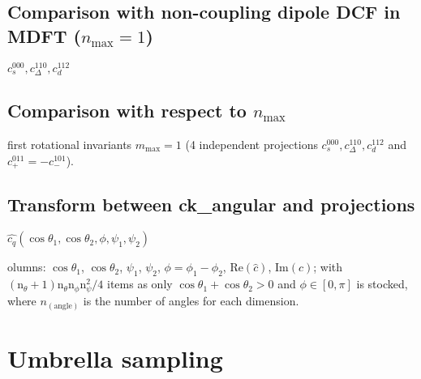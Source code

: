 \subsection{Comparison with non-coupling dipole DCF in MDFT ($n_{\max}=1$)\label{sub:Comparison-with-non-coupling}}

$c_{s}^{000},c_{\Delta}^{110},c_{d}^{112}$ 


\subsection{Comparison with respect to $n_{\max}$}

first rotational invariants $m{}_{\mathrm{max}}=1$ (4 independent
projections $c_{s}^{000},c_{\Delta}^{110},c_{d}^{112}$ and $c_{+}^{011}=-c_{-}^{101}$).


\subsection{Transform between ck\_angular and projections}

$\hat{c_{q}}(\cos\theta_{1},\cos\theta_{2},\phi,\psi_{1},\psi_{2})$

olumns: $\cos\theta_{1}$, $\cos\theta_{2}$, $\psi_{1}$, $\psi_{2}$,
$\phi=\phi_{1}-\phi_{2}$, $\mathrm{Re}(\hat{c})$, $\mathrm{Im}(\hat{c})$;
with $(\mathrm{n}_{\theta}+1)\mathrm{n}_{\theta}\mathrm{n}_{\phi}\mathrm{n}_{\psi}^{2}/4$
items as only $\cos\theta_{1}+\cos\theta_{2}>0$ and $\phi\in\left[0,\pi\right]$
is stocked, where $n_{\mathrm{(angle)}}$ is the number of angles
for each dimension. 


\section{Umbrella sampling}
